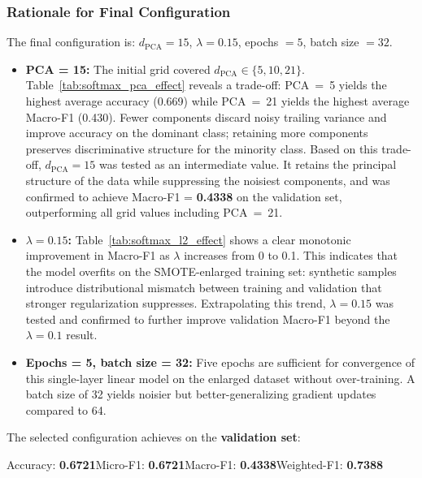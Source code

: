 \documentclass[12pt,a4paper]{article}
\begin{document}
\subsubsection*{Rationale for Final Configuration}

The final configuration is: $d_{\text{PCA}} = 15$, $\lambda = 0.15$, epochs $= 5$, batch size $= 32$.

\begin{itemize}
    \item \textbf{PCA = 15:} The initial grid covered $d_{\text{PCA}} \in \{5, 10, 21\}$. Table~\ref{tab:softmax_pca_effect} reveals a trade-off: PCA~=~5 yields the highest average accuracy (0.669) while PCA~=~21 yields the highest average Macro-F1 (0.430). Fewer components discard noisy trailing variance and improve accuracy on the dominant class; retaining more components preserves discriminative structure for the minority class. Based on this trade-off, $d_{\text{PCA}} = 15$ was tested as an intermediate value. It retains the principal structure of the data while suppressing the noisiest components, and was confirmed to achieve Macro-F1 = \textbf{0.4338} on the validation set, outperforming all grid values including PCA~=~21.

    \item \textbf{$\lambda = 0.15$:} Table~\ref{tab:softmax_l2_effect} shows a clear monotonic improvement in Macro-F1 as $\lambda$ increases from 0 to 0.1. This indicates that the model overfits on the SMOTE-enlarged training set: synthetic samples introduce distributional mismatch between training and validation that stronger regularization suppresses. Extrapolating this trend, $\lambda = 0.15$ was tested and confirmed to further improve validation Macro-F1 beyond the $\lambda = 0.1$ result.

    \item \textbf{Epochs = 5, batch size = 32:} Five epochs are sufficient for convergence of this single-layer linear model on the enlarged dataset without over-training. A batch size of 32 yields noisier but better-generalizing gradient updates compared to 64.
\end{itemize}

\noindent The selected configuration achieves on the \textbf{validation set}:
\begin{center}
    Accuracy: \textbf{0.6721}\quad Micro-F1: \textbf{0.6721}\quad Macro-F1: \textbf{0.4338}\quad Weighted-F1: \textbf{0.7388}
\end{center}
\end{document}
